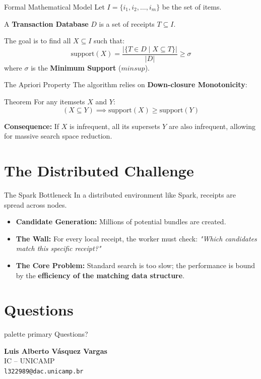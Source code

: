 \documentclass[xcolor={dvipsnames}]{beamer}
\makeatletter
\newcommand{\MyAuthor}{Luis Alberto Vásquez Vargas}
\newcommand{\MyInstitute}{IC -- UNICAMP}
\newcommand{\MyEmail}{l322989@dac.unicamp.br}
\makeatother
\begin{document}
\begin{frame}{Formal Mathematical Model}
    Let $I = \{i_1, i_2, \dots, i_m\}$ be the set of items.
    \begin{definition}
        A \textbf{Transaction Database} $D$ is a set of receipts $T \subseteq I$.
    \end{definition}
    \vfill
    The goal is to find all $X \subseteq I$ such that:
    \begin{equation*}
        \text{support}(X) = \frac{|\{T \in D \mid X \subseteq T\}|}{|D|} \ge \sigma
    \end{equation*}
    where $\sigma$ is the \textbf{Minimum Support} ($minsup$).
\end{frame}

\begin{frame}{The Apriori Property}
    The algorithm relies on \textbf{Down-closure Monotonicity}:
    \vfill
    \begin{exampleblock}{Theorem}
        For any itemsets $X$ and $Y$:
        \[ (X \subseteq Y) \implies \text{support}(X) \ge \text{support}(Y) \]
    \end{exampleblock}
    \vfill
    \textbf{Consequence:} If $X$ is infrequent, all its supersets $Y$ are also infrequent, allowing for massive search space reduction.
\end{frame}

\section{The Distributed Challenge}

\begin{frame}{The Spark Bottleneck}
    In a distributed environment like Spark, receipts are spread across nodes.
    \vfill
    \begin{itemize}
        \item \textbf{Candidate Generation:} Millions of potential bundles are created.
        \item \textbf{The Wall:} For every local receipt, the worker must check: 
        \textit{"Which candidates match this specific receipt?"}
        \item \textbf{The Core Problem:} Standard search is too slow; the performance is bound by the \textbf{efficiency of the matching data structure}.
    \end{itemize}
\end{frame}

\section*{Questions}
\begin{frame}[plain]
  \centering
  \vfill
  \begin{beamercolorbox}[sep=12pt,center,rounded=true,shadow=true]{palette primary}
    \Huge Questions?
  \end{beamercolorbox}
  \vfill
  \textbf{\MyAuthor} \\
  \small \MyInstitute \\
  \vspace{0.2cm}
  \small \texttt{\MyEmail}
  \vfill
\end{frame}
\end{document}
